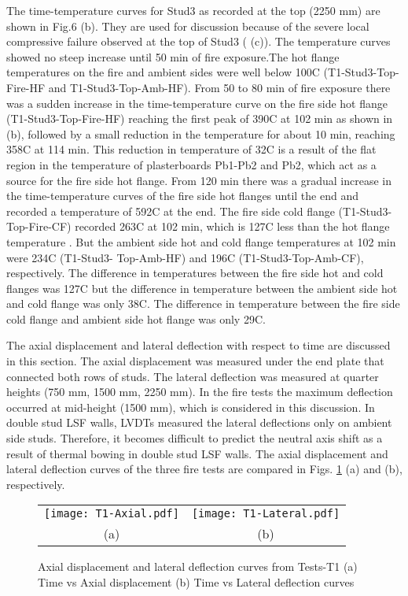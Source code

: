 The time-temperature curves for Stud3 as recorded at the top (2250 mm) are shown in Fig.6 (b). They are used for discussion because of the severe local compressive failure observed at the top of Stud3 ( (c)). The temperature curves showed no steep increase until 50 min of fire exposure.The hot flange temperatures on the fire and ambient sides were well below 100\degree C (T1-Stud3-Top-Fire-HF and T1-Stud3-Top-Amb-HF). From 50 to 80 min of fire exposure there was a sudden increase in the time-temperature curve on the fire side hot flange (T1-Stud3-Top-Fire-HF) reaching the first peak of 390\degree C at 102 min as shown in  (b), followed by a small reduction in the temperature for about 10 min, reaching 358\degree C at 114 min. This reduction in temperature of 32\degree C is a result of the flat region in the temperature of plasterboards Pb1-Pb2 and Pb2, which act as a source for the fire side hot flange. From 120 min there was a gradual increase in the time-temperature curves of the fire side hot flanges until the end and recorded a temperature of 592\degree C at the end. The fire side cold flange (T1-Stud3-Top-Fire-CF) recorded 263\degree C at 102 min, which is 127\degree C less than the hot flange temperature . But the ambient side hot and cold flange temperatures at 102 min were 234\degree C (T1-Stud3- Top-Amb-HF) and 196\degree C (T1-Stud3-Top-Amb-CF), respectively. The difference in temperatures between the fire side hot and cold flanges was 127\degree C but the difference in temperature between the ambient side hot and cold flange was only 38\degree C. The difference in temperature between the fire side cold flange and ambient side hot flange was only 29\degree C.

The axial displacement and lateral deflection with respect to time are discussed in this section. The axial displacement was measured under the end plate that connected both rows of studs. The lateral deflection was measured at quarter heights (750 mm, 1500 mm, 2250 mm). In the fire tests the maximum deflection occurred at mid-height (1500 mm), which is considered in this discussion. In double stud LSF walls, LVDTs measured the lateral deflections only on ambient side studs. Therefore, it becomes difficult to predict the neutral axis shift as a result of thermal bowing in double stud LSF walls. The axial displacement and lateral deflection curves of the three fire tests are compared in Figs. \ref{fig:T1-Axial-Lateral} (a) and (b), respectively.
	\begin{figure}[!htbp]
	\centering
		\begin{tabular}{cc}
			\texttt{[image: T1-Axial.pdf]} & \texttt{[image: T1-Lateral.pdf]} \\
			(a) & (b) \\
		\end{tabular} 
		\caption{Axial displacement and lateral deflection curves from Tests-T1 (a) Time vs Axial displacement (b) Time vs Lateral deflection curves}
		\label{fig:T1-Axial-Lateral}
\end{figure}

